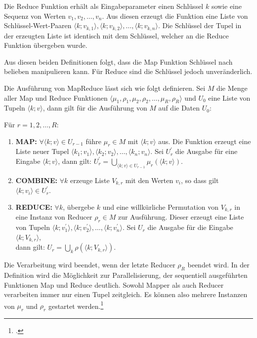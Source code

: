 Die Reduce Funktion erhält als Eingabeparameter einen Schlüssel $k$ sowie eine Sequenz von Werten $v_1, v_2, \dots, v_n$. Aus diesen erzeugt die Funktion eine Liste von Schlüssel-Wert-Paaren $\langle k; v_{k,1} \rangle, \langle k; v_{k,2} \rangle, \dots, \langle k; v_{k,n} \rangle$. Die Schlüssel der Tupel in der erzeugten Liste ist identisch mit dem Schlüssel, welcher an die Reduce Funktion übergeben wurde.

Aus diesen beiden Definitionen folgt, dass die Map Funktion Schlüssel nach belieben manipulieren kann. Für Reduce sind die Schlüssel jedoch unveränderlich.

Die Ausführung von MapReduce lässt sich wie folgt definieren. Sei $M$ die Menge aller Map und Reduce Funktionen $\langle \mu_1, \rho_1, \mu_2, \rho_2, \dots, \mu_R, \rho_R \rangle$ und $U_0$ eine Liste von Tupeln $\langle k; v \rangle$, dann gilt für die Ausführung von $M$ auf die Daten $U_0$:

Für $r = 1, 2, \dots, R$:

\begin{enumerate}
	\item \textbf{MAP:} $\forall \langle k; v \rangle \in U_{r-1}$ führe $\mu_r \in M$ mit $\langle k; v \rangle$ aus. Die Funktion erzeugt eine Liste neuer Tupel $\langle k_1; v_1 \rangle, \langle k_2; v_2 \rangle, \dots, \langle k_n; v_n \rangle$. Sei $U_r^{\prime}$ die Ausgabe für eine Eingabe $\langle k; v \rangle$, dann gilt: $U_r^{\prime} = \bigcup_{\langle k; v \rangle \in U_{r-1}} \mu_r(\langle k; v\rangle)$.
	\item \textbf{COMBINE:} $\forall k$ erzeuge Liste $V_{k,r}$ mit den Werten $v_i$, so dass gilt $\langle k; v_i \rangle \in U_r^{\prime}$.
	\item \textbf{REDUCE:} $\forall k$, übergebe $k$ und eine willkürliche Permutation von $V_{k,r}$ in eine Instanz von Reducer $\rho_r \in M$ zur Ausführung. Dieser erzeugt eine Liste von Tupeln $\langle k; v_1^{\prime} \rangle, \langle k; v_2^{\prime} \rangle, \dots, \langle k; v_n^{\prime} \rangle$. Sei $U_r$ die Ausgabe für die Eingabe $\langle k; V_{k,r} \rangle$, \\ dann gilt: $U_r = \bigcup_k \rho(\langle k; V_{k,r}\rangle)$.
\end{enumerate}

Die Verarbeitung wird beendet, wenn der letzte Reducer $\rho_R$ beendet wird. In der Definition wird die Möglichkeit zur Parallelisierung, der sequentiell ausgeführten Funktionen Map und Reduce deutlich. Sowohl Mapper als auch Reducer verarbeiten immer nur einen Tupel zeitgleich. Es können also mehrere Instanzen von $\mu_r$ und $\rho_r$ gestartet werden.\footcite[Vgl.][S. 2 f]{Karloff.2010}

